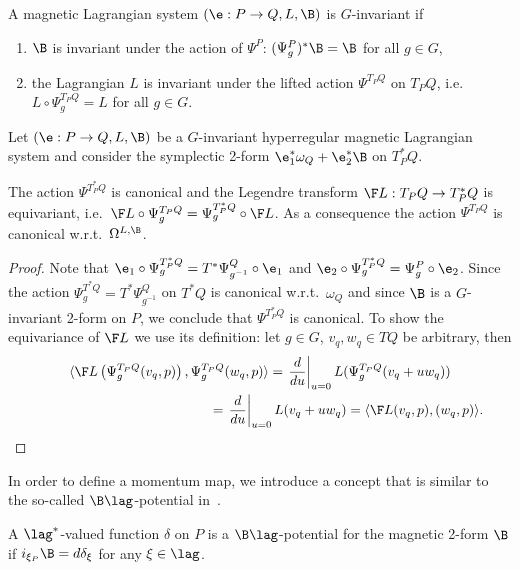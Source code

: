 \begin{definition}  A magnetic Lagrangian system $(\e:P\to Q,L,\B)$ is $G$-invariant if
\begin{enumerate}\itemsep=0pt
\item[1)] $\B$ is invariant under the action of $\Psi^P$: $(\Psi^P_g)^*\B = \B$ for all $g\in G$,
\item[2)] the Lagrangian $L$ is invariant under the lifted action $\Psi^{T_PQ}$ on $T_PQ$, i.e.\ $L\circ \Psi^{T_PQ}_g = L$ for all $g\in G$.
    \end{enumerate}
\end{definition}



Let  $(\e:P\to Q, L,\B)$ be a $G$-invariant hyperregular magnetic Lagrangian system and consider the symplectic 2-form $\e^*_1\omega_Q +\e^*_2 \B$ on $T^*_PQ$.
\begin{proposition}\label{prop:equivleg} The action $\Psi^{T^*_PQ}$ is canonical and the Legendre transform $\F L: T_PQ\to T_P^*Q$ is equivariant, i.e.\  $\F L \circ \Psi^{T_PQ}_g=\Psi_g^{T^*_PQ}\circ \F L$. As a consequence the action $\Psi^{T_PQ}$ is canonical w.r.t.~$\Omega^{L,\B}$.
\end{proposition}
\begin{proof}
Note that $\e_1 \circ \Psi^{T^*_PQ}_g = T^*\Psi^Q_{g^{-1}}\circ \e_1$ and $\e_2 \circ \Psi^{T^*_PQ}_g = \Psi^P_g\circ \e_2$. Since the action $\Psi^{T^*Q}_g=T^*\Psi^Q_{g^{-1}}$ on $T^*Q$ is canonical w.r.t.\ $\omega_Q$ and since $\B$ is a $G$-invariant 2-form on $P$, we conclude that $\Psi^{T^*_PQ}$ is canonical. To show the equivariance of $\F L$ we use its def\/inition: let $g\in G$, $v_q,w_q\in TQ$ be arbitrary, then
\begin{gather*}
\langle \F L\left(\Psi_g^{T_PQ}(v_q,p)\right) , \Psi_g^{T_PQ} (w_q,p) \rangle  = \left.\frac{d}{du}\right|_{u=0} L( \Psi_g^{T_PQ}(v_q+uw_q))\\
\hphantom{\langle \F L\left(\Psi_g^{T_PQ}(v_q,p)\right) , \Psi_g^{T_PQ} (w_q,p) \rangle}{}
=\left.\frac{d}{du}\right|_{u=0} L(v_q+uw_q) = \langle \F L(v_q,p), (w_q,p)\rangle. \tag*{\qed}
\end{gather*}\renewcommand{\qed}{}
\end{proof}

In order to def\/ine a momentum map, we introduce a concept that is similar to the so-called  $\B\lag$-potential in~\cite{MarsdenHamRed}.

\begin{definition} \label{def:bgpotential}
A $\lag^*$-valued function $\delta$ on $P$ is a $\B\lag$-potential for the magnetic 2-form $\B$ if $i_{\xi_{P}}\B = d\delta_{\xi}$  for any $\xi \in \lag$.
\end{definition}

